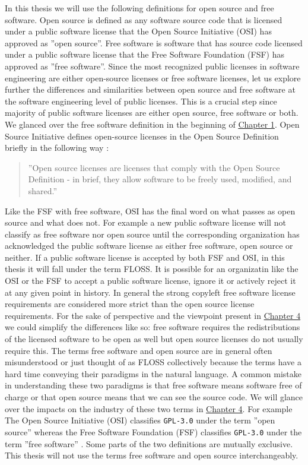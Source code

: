 In this thesis we will use the following definitions for open source and free software. Open source is defined as any software source code that is licensed under a public software license that the Open Source Initiative (OSI) has approved as ''open source''. Free software is software that has source code licensed under a public software license that the Free Software Foundation (FSF) has approved as ''free software''. Since the most recognized public licenses in software engineering are either open-source licenses or free software licenses, let us explore further the differences and similarities between open source and free software at the software engineering level of public licenses. This is a crucial step since majority of public software licenses are either open source, free software or both. We glanced over the free software definition in the beginning of \hyperref[intro]{Chapter 1}. Open Source Initiative defines open-source licenses in the Open Source Definition briefly in the following way \citep{osi:licenselist}:
\begin{quote}
	''Open source licenses are licenses that comply with the Open Source Definition - in brief, they allow software to be freely used, modified, and shared.''
\end{quote}
Like the FSF with free software, OSI has the final word on what passes as open source and what does not. For example a new public software license will not classify as free software nor open source until the corresponding organization has acknowledged the public software license as either free software, open source or neither. If a public software license is accepted by both FSF and OSI, in this thesis it will fall under the term FLOSS. It is possible for an organizatin like the OSI or the FSF to accept a public software license, ignore it or actively reject it at any given point in history. In general the strong copyleft free software license requirements are considered more strict than the open source license requirements. For the sake of perspective and the viewpoint present in \hyperref[discussion]{Chapter 4} we could simplify the differences like so: free software requires the redistributions of the licensed software to be open as well but open source licenses do not usually require this. The terms free software and open source are in general often misunderstood or just thought of as FLOSS collectively because the terms have a hard time conveying their paradigms in the natural language. A common mistake in understanding these two paradigms is that free software means software free of charge or that open source means that we can see the source code. We will glance over the impacts on the industry of these two terms in \hyperref[discussion]{Chapter 4}. For example The Open Source Initiative (OSI) classifies \texttt{GPL-3.0} under the term ''open source'' whereas the Free Software Foundation (FSF) classifies \texttt{GPL-3.0} under the term ''free software'' \citep{osi:gplv3}\citep{rms:opensource}. Some parts of the two definitions are mutually exclusive. This thesis will not use the terms free software and open source interchangeably.

